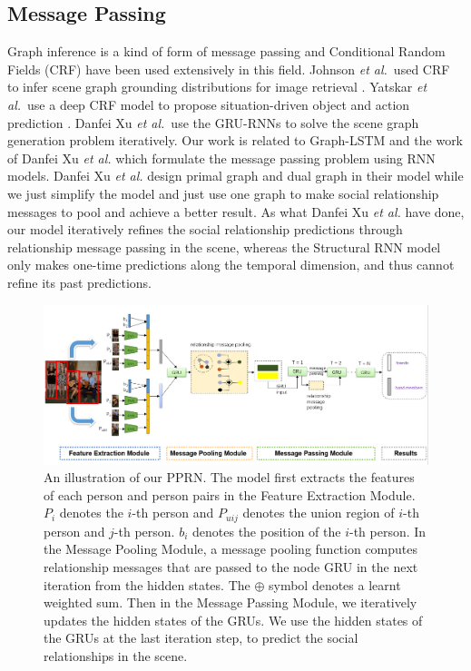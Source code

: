 \documentclass{article}
\newcommand{\PPRN}{{\sf PPRN}}
\newcommand{\etal}{{\it et al.}}
\begin{document}
\subsection{Message Passing}%
Graph inference is a kind of form of message passing and Conditional Random Fields (CRF) have been used extensively in this field. Johnson \etal \ used CRF to infer scene graph grounding distributions for image retrieval \cite{DBLP:conf/cvpr/JohnsonKSLSBL15}. Yatskar \etal \ use a deep CRF model to propose situation-driven object and action prediction\cite{DBLP:conf/cvpr/YatskarZF16} . Danfei Xu \etal \ use the GRU-RNNs to solve the scene graph generation problem iteratively\cite{DBLP:conf/cvpr/XuZCF17}. Our work is related to Graph-LSTM \cite{DBLP:conf/eccv/LiangSFLY16} and  the work of  Danfei Xu \etal \cite{DBLP:conf/cvpr/XuZCF17} which formulate the message passing problem using RNN models. Danfei Xu \etal \cite{DBLP:conf/cvpr/XuZCF17} design primal graph and dual graph in their model while we just simplify the model and just use one graph to make social relationship messages to pool and achieve a better result. As what Danfei Xu \etal \cite{DBLP:conf/cvpr/XuZCF17} have done, our model iteratively refines the social relationship predictions through relationship message passing in the scene, whereas the Structural RNN model only makes one-time predictions along the temporal dimension, and thus cannot refine its past predictions\cite{DBLP:conf/cvpr/XuZCF17}.
\vspace*{-3mm}
\begin{figure}[htpb]
	\centering
	\includegraphics[width=0.96 \textwidth,clip]{./pic/model_2.png}
	\caption{An illustration of our \PPRN . The model first extracts the features of each person and person pairs in the Feature Extraction Module. $P_i$ denotes the $i$-th person and $P_{uij}$ denotes the union region of $i$-th person and $j$-th person. $b_i$ denotes the position of the $i$-th person. In the Message Pooling Module, a message pooling function computes relationship messages that are passed to the node GRU in the next iteration from the hidden states. The $\oplus$ symbol denotes a learnt weighted sum. Then in the Message Passing Module, we iteratively updates the hidden states of the GRUs. We use the hidden states of the GRUs at the last iteration step, to predict the social relationships in the scene.}
	\vspace*{-3.5mm}
	\label{fig:model}
\end{figure}
\end{document}
